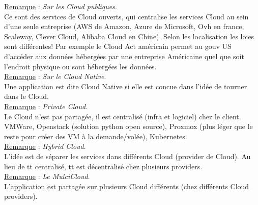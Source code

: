 \documentclass[a4paper,12pt,twoside]{article}
\newcommand{\rem}[2]{\noindent\underline{Remarque} : \textit{#1}.\\ \indent #2}
\begin{document}
\rem{Sur les Cloud publiques}{Ce sont des services de Cloud ouverts, qui centralise les services Cloud au sein d'une seule entreprise (AWS de Amazon, Azure de Microsoft, Ovh en france, Scaleway, Clever Cloud, Alibaba Cloud en Chine). Selon les localisation les loies sont différentes! Par exemple le Cloud Act américain permet au gouv US d'accéder aux données hébergées par une entreprise Américaine quel que soit l'endroit physique ou sont hébergées les données.}\\

\rem{Sur le Cloud Native}{Une application est dite Cloud Native si elle est concue dans l'idée de tourner dans le Cloud.}\\

\rem{Private Cloud}{Le Cloud n'est pas partagée, il est centralisé (infra et logiciel) chez le client. VMWare, Openstack (solution python open source), Proxmox (plus léger que le reste pour créer des VM à la demande/volée), Kubernetes.}\\

\rem{Hybrid Cloud}{L'idée est de séparer les services dans différents Cloud (provider de Cloud). Au lieu de tt centralisé, tt est décentralisé chez plusieurs providers.}\\

\rem{Le MulciCloud}{L'application est partagée sur plusieurs Cloud différents (chez différents Cloud providers).}\\
\end{document}
